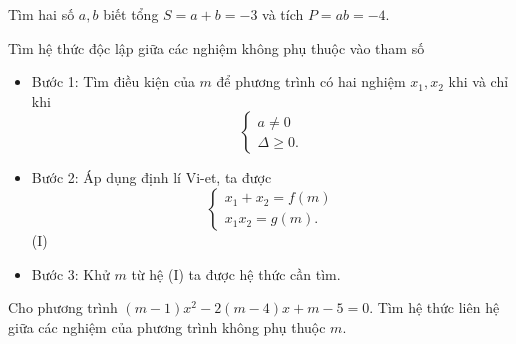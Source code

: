 \begin{vd}
	Tìm hai số $a, b$ biết tổng $S = a+ b =-3$ và tích $P = ab = -4$.
\end{vd}
\begin{dang}{Tìm hệ thức độc lập giữa các nghiệm không phụ thuộc vào tham số}
	\begin{itemize}
		\item Bước 1: Tìm điều kiện của $m$ để phương trình có hai nghiệm $x_1, x_2$ khi và chỉ khi $$\begin{cases} a\ne 0\\ \Delta\ge 0. \end{cases}$$
		\item Bước 2: Áp dụng định lí Vi-et, ta được\\
		$$\begin{cases} x_1 +x_2 =f(m)\\ x_1x_2=g(m). \end{cases}$$ \hfill(I)
		\item Bước 3: Khử $m$ từ hệ (I) ta được hệ thức cần tìm.
	\end{itemize}
	
	\end{dang}
\begin{vd}
	Cho phương trình $(m-1)x^2 -2(m-4)x+m -5 =0$. Tìm hệ thức liên hệ giữa các nghiệm của phương trình không phụ thuộc $m$.
\end{vd}
